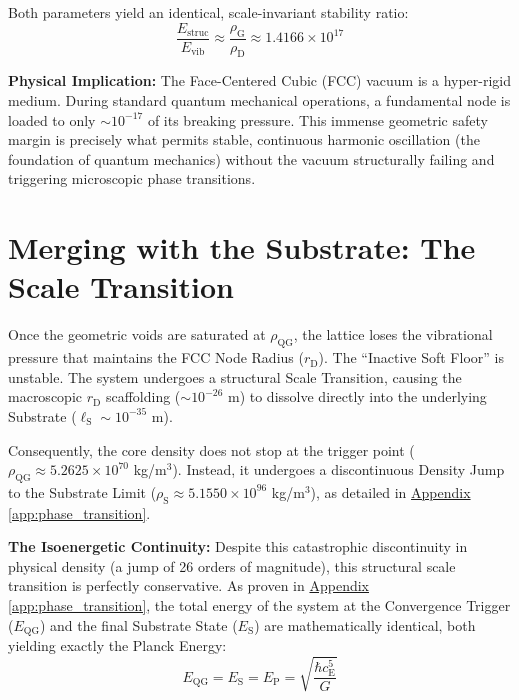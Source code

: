 Both parameters yield an identical, scale-invariant stability ratio:
\begin{equation}
    \frac{E_{\mathrm{struc}}}{E_{\mathrm{vib}}} \approx \frac{\rho_{\mathrm{G}}}{\rho_{\mathrm{D}}} \approx 1.4166 \times 10^{17}
\end{equation}

\vspace{0.5em}
\noindent\textbf{Physical Implication:} The Face-Centered Cubic (FCC) vacuum is a hyper-rigid medium. During standard quantum mechanical operations, a fundamental node is loaded to only $\sim 10^{-17}$ of its breaking pressure. This immense geometric safety margin is precisely what permits stable, continuous harmonic oscillation (the foundation of quantum mechanics) without the vacuum structurally failing and triggering microscopic phase transitions.

\section{Merging with the Substrate: The Scale Transition}
\label{sec:phase_transition}
Once the geometric voids are saturated at $\rho_{\mathrm{QG}}$, the lattice loses the vibrational pressure that maintains the FCC Node Radius ($r_{\mathrm{D}}$). The ``Inactive Soft Floor'' is unstable. The system undergoes a structural Scale Transition, causing the macroscopic $r_{\mathrm{D}}$ scaffolding ($\sim 10^{-26}$ m) to dissolve directly into the underlying Substrate ($\ell_{\mathrm{S}} \sim 10^{-35}$ m).

Consequently, the core density does not stop at the trigger point ($\rho_{\mathrm{QG}} \approx 5.2625 \times 10^{70}$ kg/m$^3$). Instead, it undergoes a discontinuous Density Jump to the Substrate Limit ($\rho_{\mathrm{S}} \approx 5.1550 \times 10^{96}$ kg/m$^3$), as detailed in \hyperref[app:phase_transition]{Appendix \ref*{app:phase_transition}}.

\vspace{0.5em}
\noindent\textbf{The Isoenergetic Continuity:} Despite this catastrophic discontinuity in physical density (a jump of 26 orders of magnitude), this structural scale transition is perfectly conservative. As proven in \hyperref[app:phase_transition]{Appendix \ref*{app:phase_transition}}, the total energy of the system at the Convergence Trigger ($E_{\mathrm{QG}}$) and the final Substrate State ($E_{\mathrm{S}}$) are mathematically identical, both yielding exactly the Planck Energy:
\begin{equation}
    E_{\mathrm{QG}} = E_{\mathrm{S}} = E_{\mathrm{P}} = \sqrt{\frac{\hbar c_{\mathrm{E}}^5}{G}}
\end{equation}

